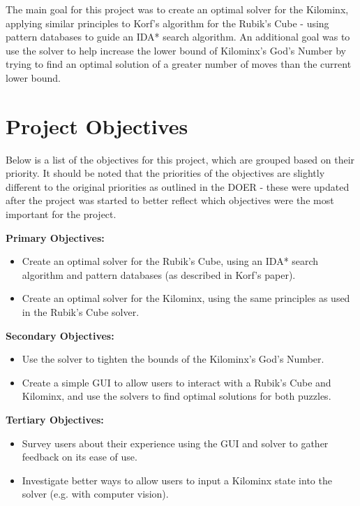 The main goal for this project was to create an optimal solver for the Kilominx, applying similar principles to Korf's algorithm for the Rubik's Cube -  using pattern databases to guide an IDA* search algorithm. An additional goal was to use the solver to help increase the lower bound of Kilominx's God's Number by trying to find an optimal solution of a greater number of moves than the current lower bound.

\section{Project Objectives}
\label{section:objectives}
Below is a list of the objectives for this project, which are grouped based on their priority. It should be noted that the priorities of the objectives are slightly different to the original priorities as outlined in the DOER - these were updated after the project was started to better reflect which objectives were the most important for the project.

\textbf{Primary Objectives:}
\begin{itemize}
    \item Create an optimal solver for the Rubik's Cube, using an IDA* search algorithm and pattern databases (as described in Korf's paper).
    \item Create an optimal solver for the Kilominx, using the same principles as used in the Rubik's Cube solver.
\end{itemize}

\textbf{Secondary Objectives:}
\begin{itemize}
    \item Use the solver to tighten the bounds of the Kilominx's God's Number.
    \item Create a simple GUI to allow users to interact with a Rubik's Cube and Kilominx, and use the solvers to find optimal solutions for both puzzles.
\end{itemize}

\textbf{Tertiary Objectives:}
\begin{itemize}
    \item Survey users about their experience using the GUI and solver to gather feedback on its ease of use.
    \item Investigate better ways to allow users to input a Kilominx state into the solver (e.g. with computer vision).
\end{itemize}